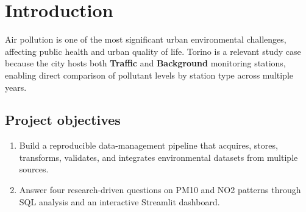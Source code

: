 \documentclass[11pt,a4paper]{article}
\begin{document}
\vspace{0.4cm}
\tableofcontents
\newpage

\begin{abstract}
This project analyzes air quality in Torino by integrating heterogeneous environmental datasets into a reproducible analytical pipeline. The system combines annual air-quality statistics from EEA DiscoData, hourly meteorological observations from Open-Meteo, and reverse-geocoded station metadata from Nominatim / OpenStreetMap. Data are acquired through automated Python pipelines, stored in Google BigQuery, transformed with dbt, validated through automated tests, and exposed through SQL queries and a Streamlit dashboard. The project addresses all phases required by the Data Management course: acquisition, storage, profiling, integration, analysis, and quality improvement. Particular attention is paid to enrichment quality measurement, especially for spatial integration, in line with the course FAQ.
\end{abstract}

\tableofcontents
\newpage

\section{Introduction}

Air pollution is one of the most significant urban environmental challenges, affecting
public health and urban quality of life. Torino is a relevant study case because the city
hosts both \textbf{Traffic} and \textbf{Background} monitoring stations, enabling direct
comparison of pollutant levels by station type across multiple years.

\subsection{Project objectives}

\begin{enumerate}
  \item Build a reproducible data-management pipeline that acquires, stores, transforms,
        validates, and integrates environmental datasets from multiple sources.
  \item Answer four research-driven questions on PM10 and NO2 patterns through SQL analysis
        and an interactive Streamlit dashboard.
\end{enumerate}
\end{document}
